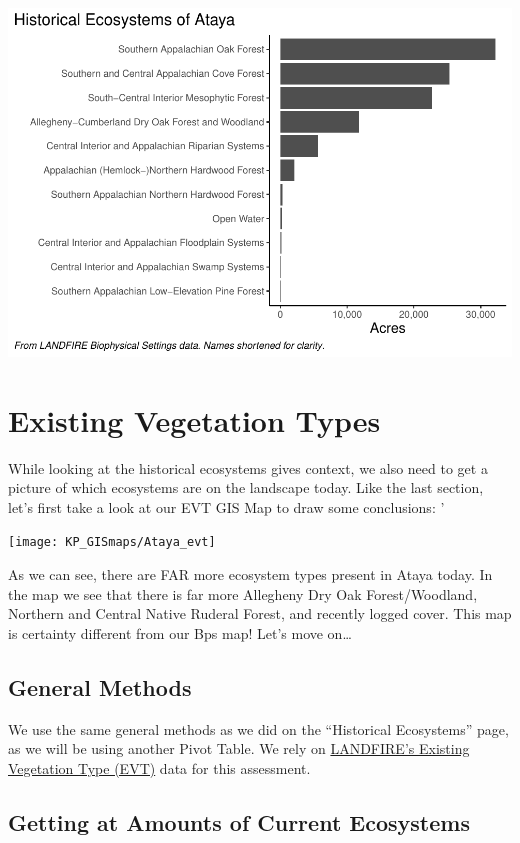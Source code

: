\documentclass[
]{book}
\begin{document}
\includegraphics{FSCBook_files/figure-latex/bpsChart-1.pdf}

\hypertarget{evt}{%
\chapter{Existing Vegetation Types}\label{evt}}

While looking at the historical ecosystems gives context, we also need to get a picture of which ecosystems are on the landscape today. Like the last section, let's first take a look at our EVT GIS Map to draw some conclusions:
'

\texttt{[image: KP\_GISmaps/Ataya\_evt]}

As we can see, there are FAR more ecosystem types present in Ataya today. In the map we see that there is far more Allegheny Dry Oak Forest/Woodland, Northern and Central Native Ruderal Forest, and recently logged cover. This map is certainty different from our Bps map! Let's move on\ldots{}

\hypertarget{general-methods-1}{%
\section{General Methods}\label{general-methods-1}}

We use the same general methods as we did on the ``Historical Ecosystems'' page, as we will be using another Pivot Table. We rely on \href{https://www.landfire.gov/evt.php}{LANDFIRE's Existing Vegetation Type (EVT)} data for this assessment.

\hypertarget{getting-at-amounts-of-current-ecosystems}{%
\section{Getting at Amounts of Current Ecosystems}\label{getting-at-amounts-of-current-ecosystems}}
\end{document}
